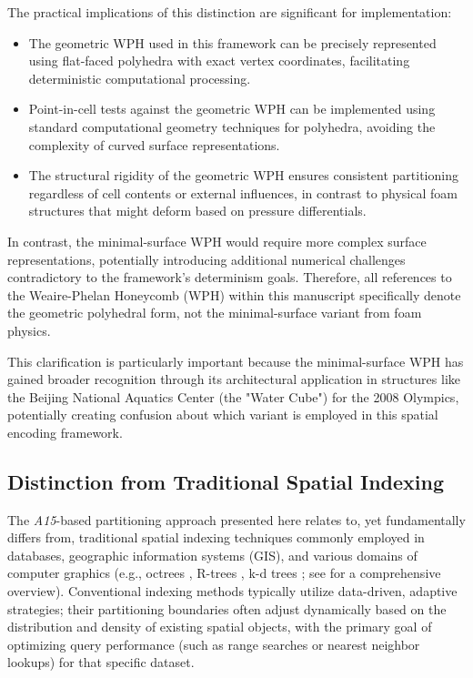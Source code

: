 \documentclass[10pt]{article}
\def\AAAB{\textit{A15}}
\begin{document}
The practical implications of this distinction are significant for implementation:
\begin{itemize}
    \item The geometric WPH used in this framework can be precisely represented using flat-faced polyhedra with exact vertex coordinates, facilitating deterministic computational processing.
    \item Point-in-cell tests against the geometric WPH can be implemented using standard computational geometry techniques for polyhedra, avoiding the complexity of curved surface representations.
    \item The structural rigidity of the geometric WPH ensures consistent partitioning regardless of cell contents or external influences, in contrast to physical foam structures that might deform based on pressure differentials.
\end{itemize}

In contrast, the minimal-surface WPH would require more complex surface representations, potentially introducing additional numerical challenges contradictory to the framework's determinism goals. Therefore, all references to the Weaire-Phelan Honeycomb (WPH) within this manuscript specifically denote the geometric polyhedral form, not the minimal-surface variant from foam physics.

This clarification is particularly important because the minimal-surface WPH has gained broader recognition through its architectural application in structures like the Beijing National Aquatics Center (the "Water Cube") for the 2008 Olympics, potentially creating confusion about which variant is employed in this spatial encoding framework.

\subsection{Distinction from Traditional Spatial Indexing}\label{subsec-comparison-indexing}

The \AAAB{}-based partitioning approach presented here relates to, yet fundamentally differs from, traditional spatial indexing techniques commonly employed in databases, geographic information systems (GIS), and various domains of computer graphics (e.g., octrees \cite{Finkel1974}, R-trees \cite{Guttman1984}, k-d trees \cite{Bentley1975}; see \cite{Samet1990} for a comprehensive overview). Conventional indexing methods typically utilize data-driven, adaptive strategies; their partitioning boundaries often adjust dynamically based on the distribution and density of existing spatial objects, with the primary goal of optimizing query performance (such as range searches or nearest neighbor lookups) for that specific dataset.
\end{document}
